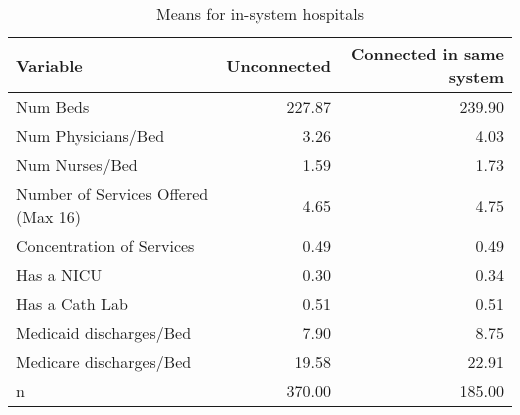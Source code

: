 \begin{table}

\caption{Means for in-system hospitals}
\centering
\begin{tabular}[t]{l|r|r}
\hline
Variable & Unconnected & Connected in same system\\
\hline
Num Beds & 227.87 & 239.90\\
\hline
Num Physicians/Bed & 3.26 & 4.03\\
\hline
Num Nurses/Bed & 1.59 & 1.73\\
\hline
Number of Services Offered (Max 16) & 4.65 & 4.75\\
\hline
Concentration of Services & 0.49 & 0.49\\
\hline
Has a NICU & 0.30 & 0.34\\
\hline
Has a Cath Lab & 0.51 & 0.51\\
\hline
Medicaid discharges/Bed & 7.90 & 8.75\\
\hline
Medicare discharges/Bed & 19.58 & 22.91\\
\hline
n & 370.00 & 185.00\\
\hline
\end{tabular}
\end{table}
